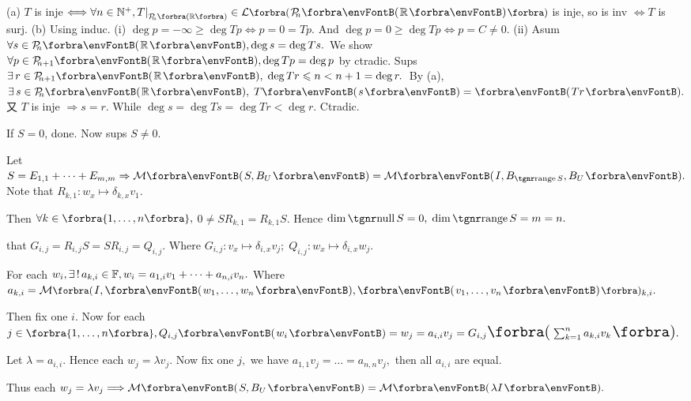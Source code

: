(a) $T$ is inje $\Longleftrightarrow\forall n\in\Nbp,T\mmid_{\PoR[\SmallPar]{n}}\in\Lm[\BigPar]{\PoR{n}}$ is inje, so is inv $\Longleftrightarrow T$ is surj.\parSol{}
(b) Using induc.\parSol{\Hb}
(i) $\deg p=-\infty\geqslant\deg Tp\Longleftrightarrow p=0=Tp.$ And $\deg p=0\geqslant\deg Tp\Longleftrightarrow p=C\neq 0.$\parSol{\vspace{2pt}\Endi\Hb}
(ii) Asum $\forall s\in\PoR{n},\deg s=\deg Ts.$ We show $\forall p\in\PoR{n+1},\deg Tp=\deg p$ by ctradic.\parSol{\Hii\Hb}
Sups $\exists\,r\in\PoR{n+1},\;\deg Tr\leqslant n<n+1=\deg r.$ \,By (a), $\exists\,s\in\PoR{n},\;T\Par{s}=\Par{Tr}.$\parSol{\Hii\Hb}
又 $T$ is inje $\Rightarrow s=r.$ While $\deg s=\deg Ts=\deg Tr<\deg r.$ Ctradic.\PfEnd
\SepLine

If $S=0$, done. Now sups $S\neq 0.${\FontSmall\hfill{}}\par\quad
{\vspace{2pt}Let {$S=E_{1,1}+\dots+E_{m,m}\Rightarrow \Mt{S,B_U}=\Mt{I,B_{\range S},B_U}.$} Note that $R_{k,1}:w_x\mapsto\delta_{k,x}v_1.$}\par\quad
{\vspace{2pt}Then $\forall k\in\Bra{1,\dots,n},$ {\FontLarge$0\neq SR_{k,1}=R_{k,1}S.$} Hence $\dim\null S=0,\;\dim\range S=m=n.$}\par\quad
{\vspace{2pt}\NOTICE that {\FontLarge$G_{i,j}=R_{i,j}S=SR_{i,j}=Q_{i,j}$}. Where $G_{i,j}:v_x\mapsto\delta_{i,x}v_j;\;Q_{i,j}:w_x\mapsto\delta_{i,x}w_j.$}\par\quad
For each $w_i,\exists\,!\,a_{k,i}\in{\mathbb{F}},w_i=a_{1,i}v_1+\dots+a_{n,i}v_n.$ Where $a_{k,i}=\Mt[\BigPar]{I,\Par{w_1,\dots,w_n},\Par{v_1,\dots,v_n}}{_{k,i}}.$\par\quad
Then fix one $i.$ Now for each $j\in\Bra{1,\dots,n},Q_{i,j}\Par{w_i}=w_j=a_{i,i}v_j=G_{i,j}\envFontLarge\BigPar{\sum_{k=1}^na_{k,i} v_k}.$\par\quad
Let $\lambda=a_{i,i}.$ Hence each $w_j=\lambda v_j.$ Now fix one $j,$ we have $a_{1,1}v_j=\dots=a_{n,n}v_j,$ then all $a_{i,i}$ are equal.\par\quad
Thus each $w_j=\lambda v_j\Longrightarrow\Mt{S,B_U}=\Mt{\lambda I}.$\PfEnd
\SepLine

